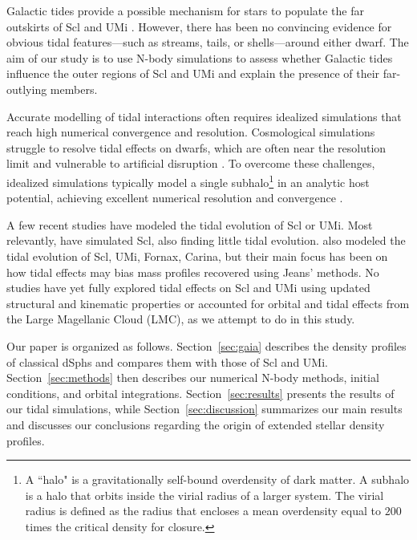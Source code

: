 \documentclass[linenumbers, twocolumn, twocolappendix]{aastex701}
\begin{document}
Galactic tides  provide a possible mechanism for stars to populate the far outskirts of Scl and UMi \citep[e.g.][]{innanen+papp1979, walcher+2003}. 
However, there has been no convincing evidence for obvious tidal features---such as streams, tails, or shells---around either dwarf.
The aim of our study is to use N-body simulations to assess whether Galactic tides influence the outer regions of Scl and UMi and explain the presence of their far-outlying members. 

Accurate modelling of tidal interactions often requires idealized simulations that reach high numerical convergence and resolution. Cosmological simulations struggle to resolve tidal effects on dwarfs, which are 
often near the resolution limit and vulnerable to artificial disruption
\citep[e.g.,][]{PNM2008, vandenbosch+2018, santos-santos+2025}. To overcome
these challenges, idealized simulations typically model a single subhalo\footnote{A ``halo" is a gravitationally self-bound overdensity of dark matter. A subhalo is a halo that orbits inside the virial radius of a larger system. The virial radius is defined as the radius that encloses a mean overdensity equal to $200$ times the critical density for closure.} in an
analytic host potential, achieving excellent numerical resolution and convergence \citep[e.g.,][]{hayashi+2003, bullock+johnston2005, penarrubia+2010, EN2021}. 

A few recent studies have modeled the tidal evolution of Scl or UMi. Most relevantly, \citet{iorio+2019} have simulated Scl, also finding little tidal evolution. \citet{tchiorniy+genina2026} also modeled the tidal evolution of Scl, UMi, Fornax, Carina, but their main focus has been on how tidal effects may bias mass profiles recovered using Jeans' methods. No studies have yet fully explored tidal effects on Scl and UMi using updated structural and kinematic properties or accounted for orbital and tidal effects from the Large Magellanic Cloud (LMC), as we attempt to do in this study. 

Our paper is organized as follows.  Section~\ref{sec:gaia}  describes the density profiles of classical dSphs and compares them with those of Scl and UMi. Section~\ref{sec:methods} then describes our numerical N-body methods, initial conditions, and orbital integrations.  Section~\ref{sec:results} presents the results of our tidal simulations, while Section~\ref{sec:discussion} summarizes our main results and discusses our conclusions regarding the origin of extended stellar density profiles.
\end{document}
